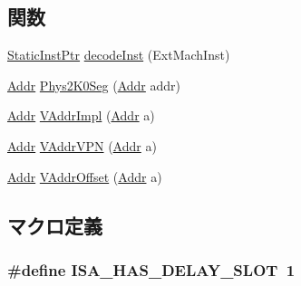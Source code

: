 \subsection*{関数}
\begin{DoxyCompactItemize}
\item 
\hyperlink{classRefCountingPtr}{StaticInstPtr} \hyperlink{namespaceMipsISA_a294cc8fc1febc2b191de37fe26cccecf}{decodeInst} (ExtMachInst)
\item 
\hyperlink{base_2types_8hh_af1bb03d6a4ee096394a6749f0a169232}{Addr} \hyperlink{namespaceMipsISA_af5384b2f3700f6a096ef6b0ccb6dfe89}{Phys2K0Seg} (\hyperlink{base_2types_8hh_af1bb03d6a4ee096394a6749f0a169232}{Addr} addr)
\item 
\hyperlink{base_2types_8hh_af1bb03d6a4ee096394a6749f0a169232}{Addr} \hyperlink{namespaceMipsISA_ad4889586a6df5d65ddc6b5e084a79055}{VAddrImpl} (\hyperlink{base_2types_8hh_af1bb03d6a4ee096394a6749f0a169232}{Addr} a)
\item 
\hyperlink{base_2types_8hh_af1bb03d6a4ee096394a6749f0a169232}{Addr} \hyperlink{namespaceMipsISA_a6a3762cb0de8ab43a6041339c5b38ba0}{VAddrVPN} (\hyperlink{base_2types_8hh_af1bb03d6a4ee096394a6749f0a169232}{Addr} a)
\item 
\hyperlink{base_2types_8hh_af1bb03d6a4ee096394a6749f0a169232}{Addr} \hyperlink{namespaceMipsISA_a2644e6b57b6479a8274c7c0c5b8bb8c3}{VAddrOffset} (\hyperlink{base_2types_8hh_af1bb03d6a4ee096394a6749f0a169232}{Addr} a)
\end{DoxyCompactItemize}


\subsection{マクロ定義}
\hypertarget{miqs_2isa__traits_8hh_aae21ac6833454e7ead9810c372658afc}{
\subsubsection[{ISA\_\-HAS\_\-DELAY\_\-SLOT}]{\setlength{\rightskip}{0pt plus 5cm}\#define ISA\_\-HAS\_\-DELAY\_\-SLOT~1}}
\label{miqs_2isa__traits_8hh_aae21ac6833454e7ead9810c372658afc}
